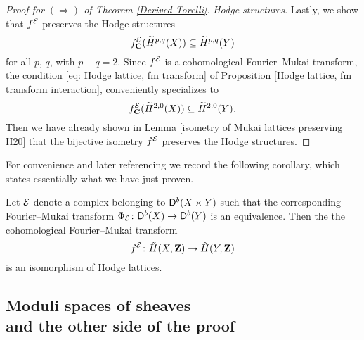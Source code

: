 \begin{proof}[Proof for $(\Rightarrow)$ of Theorem \ref{Derived Torelli}]
    \noindent
    \textsl{Hodge structures.}
    Lastly, we show that $f^{\mathcal E}$ preserves the Hodge structures \ie
    \[
        f^{\mathcal E}_\mathbf C(\widetilde{H}^{p,q}(X)) \subseteq \widetilde{H}^{p,q}(Y) 
    \]
    for all $p$, $q$, with $p + q = 2$. 
    Since $f^{\mathcal E}$ is a cohomological Fourier--Mukai transform, the condition \eqref{eq: Hodge lattice, fm transform} of Proposition \ref{Hodge lattice, fm transform interaction}, conveniently specializes to 
    \begin{equation}
        f^{\mathcal E}_\mathbf C(\widetilde{H}^{2,0}(X)) \subseteq \widetilde{H}^{2,0}(Y).
    \end{equation}
    Then we have already shown in Lemma \ref{isometry of Mukai lattices preserving H20} that the bijective isometry $f^{\mathcal E}$ preserves the Hodge structures. \qedhere
\end{proof}

For convenience and later referencing we record the following corollary, which states essentially what we have just proven. 

\begin{corollary}
    \label{FM equivalence implies FM on Mukai is an isomorphism}
    Let $\mathcal E$ denote a complex belonging to $\mathsf{D}^b(X \times Y)$ such that the corresponding Fourier--Mukai transform $\Phi_{\mathcal E} \colon \mathsf{D}^b(X) \to \mathsf{D}^b(Y)$ is an equivalence. Then the the cohomological Fourier--Mukai transform
    \[
        f^{\mathcal E} \colon \,\tilde{\!{H}}(X, \mathbf Z) \to \,\tilde{\!{H}}(Y, \mathbf Z)
    \]
    is an isomorphism of Hodge lattices.
\end{corollary}




\subsection[Moduli spaces of sheaves and the other side of the proof]{\texorpdfstring{Moduli spaces of sheaves \\ and the other side of the proof}{Moduli spaces of sheaves and the other side of the proof}
}

